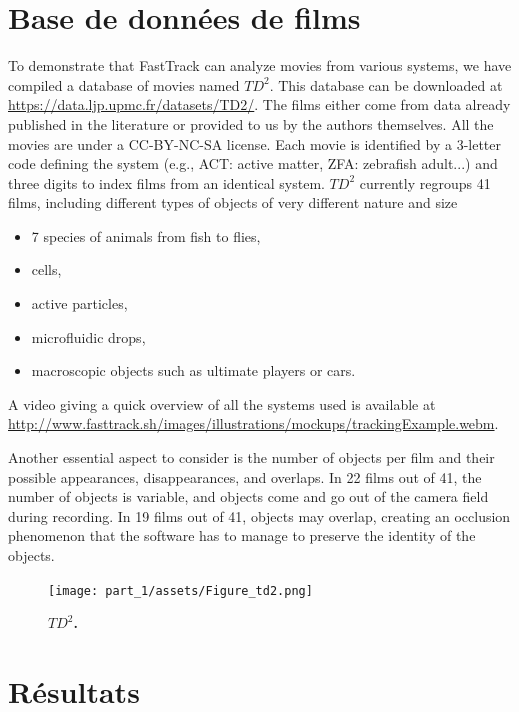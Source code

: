 \chapter{Base de données de films}
    To demonstrate that FastTrack can analyze movies from various systems, we have compiled a database of movies named $TD^2$. This database can be downloaded at \url{https://data.ljp.upmc.fr/datasets/TD2/}. The films either come from data already published in the literature or provided to us by the authors themselves. All the movies are under a CC-BY-NC-SA license. Each movie is identified by a 3-letter code defining the system (e.g., ACT: active matter, ZFA: zebrafish adult...) and three digits to index films from an identical system. $TD^2$ currently regroups 41 films, including different types of objects of very different nature and size
    \begin{itemize}
    \item 7 species of animals from fish to flies,
    \item cells,
    \item active particles,
    \item microfluidic drops,
    \item macroscopic objects such as ultimate players or cars.
    \end{itemize}
    A video giving a quick overview of all the systems used is available at \url{http://www.fasttrack.sh/images/illustrations/mockups/trackingExample.webm}.

    Another essential aspect to consider is the number of objects per film and their possible appearances, disappearances, and overlaps. In 22 films out of 41, the number of objects is variable, and objects come and go out of the camera field during recording. In 19 films out of 41, objects may overlap, creating an occlusion phenomenon that the software has to manage to preserve the identity of the objects.

	\begin{figure}[h!]
    \centering
    \texttt{[image: part\_1/assets/Figure\_td2.png]}    
    \caption{\textbf{$TD^2$.}}
    \label{part_1:fig_5}
    \end{figure}


\chapter{Résultats}

